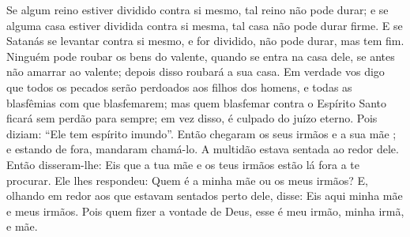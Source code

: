 {  Se algum reino estiver dividido contra si mesmo, tal reino não pode durar;
  e se alguma casa estiver dividida contra si mesma, tal casa não pode durar firme.
  E se Satanás se levantar contra si mesmo, e for dividido, não pode durar, mas tem fim.
  Ninguém pode roubar os bens do valente, quando se entra na casa dele, se antes não amarrar ao valente; depois disso roubará a sua casa.
  Em verdade vos digo que todos os pecados serão perdoados aos filhos dos homens, e todas as blasfêmias com que blasfemarem;
  mas quem blasfemar contra o Espírito Santo ficará sem perdão para sempre; em vez disso, é culpado do juízo eterno.
  Pois diziam: “Ele tem espírito imundo”.
  Então chegaram os seus irmãos e a sua mãe ; e estando de fora, mandaram chamá-lo.
  A multidão estava sentada ao redor dele. Então disseram-lhe: Eis que a tua mãe e os teus irmãos estão lá fora a te procurar.
  Ele lhes respondeu: Quem é a minha mãe ou os meus irmãos?
  E, olhando em redor aos que estavam sentados perto dele, disse: Eis aqui minha mãe e meus irmãos.
  Pois quem fizer a vontade de Deus, esse é meu irmão, minha irmã, e mãe.
\par }

